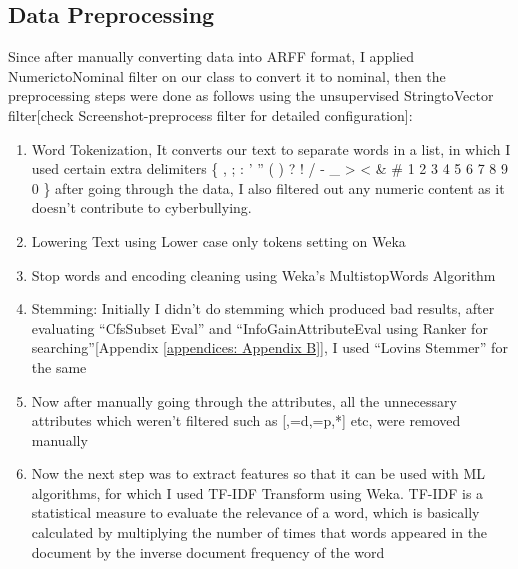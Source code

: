 \documentclass[10pt,conference]{IEEEtran}
\begin{document}
\subsection{Data Preprocessing}
Since after manually converting data into ARFF format, I applied NumerictoNominal filter on our class to convert it to nominal, then the preprocessing steps were done as follows using the unsupervised StringtoVector filter[check Screenshot-preprocess filter  for detailed configuration]:
\begin{enumerate}
    \item Word Tokenization, It converts our text to separate words in a list, in which I used certain extra delimiters  \{ , ; : ' \textquotedblright{} ( ) ? ! / - \_ \textgreater{} \textless{} \& \# 1 2 3 4 5 6 7 8 9 0 \} 
    after going through the data, I also filtered out any numeric content as it doesn’t contribute to cyberbullying.
    \item Lowering Text using Lower case only tokens setting on Weka
    \item Stop words and encoding cleaning using Weka’s MultistopWords Algorithm
    \item Stemming: Initially I didn’t do stemming which produced bad results, after evaluating “CfsSubset Eval” and “InfoGainAttributeEval using Ranker for searching”[Appendix \ref{appendices: Appendix B}], I used “Lovins Stemmer” for the same
    \item Now after manually going through the attributes, all the unnecessary attributes which weren’t filtered  such as [\textdollar{},=d,=p,*] etc, were removed manually
    \item Now the next step was to extract features so that it can be used with ML algorithms, for which I used TF-IDF Transform using Weka. TF-IDF is a statistical measure to evaluate the relevance of a word, which is basically calculated by multiplying the number of times that words appeared in the document by the inverse document frequency of the word

\end{enumerate}
\end{document}
